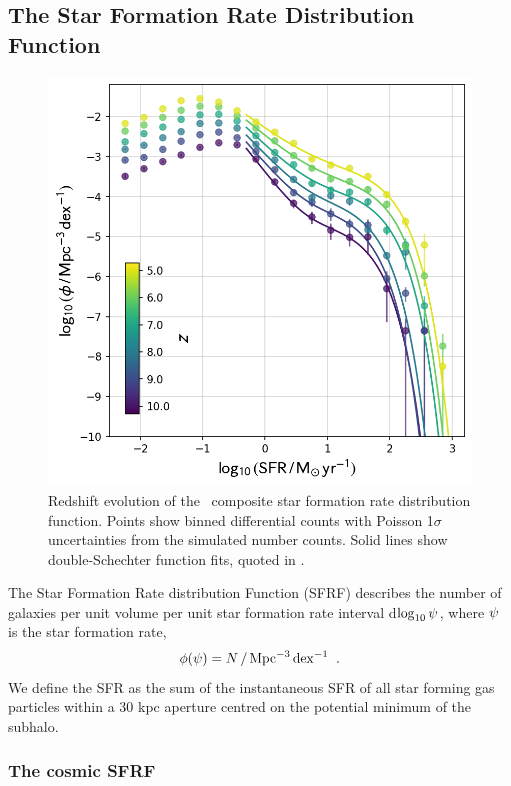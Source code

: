 \subsection{The Star Formation Rate Distribution Function}
\label{sec:cos_sfrf}

\begin{figure}
	\includegraphics[width=\columnwidth]{images/sfrf_all.png}
    \caption{Redshift evolution of the \flares\ composite star formation rate distribution function.
		Points show binned differential counts with Poisson 1$\sigma$ uncertainties from the simulated number counts.
		Solid lines show double-Schechter function fits, quoted in .}
    \label{fig:sfrf_all}
\end{figure}

The Star Formation Rate distribution Function (SFRF) describes the number of galaxies per unit volume per unit star formation rate interval d$\log_{10}\psi$, where $\psi$ is the star formation rate,
\begin{align}
     \phi(\psi) = N \,/\, \mathrm{Mpc^{-3} \, dex^{-1}}\;\;.
\end{align}
We define the SFR as the sum of the instantaneous SFR of all star forming gas particles within a 30 kpc aperture centred on the potential minimum of the subhalo.

\subsubsection{The cosmic SFRF}
\label{sec:results:sfrf:cosmic}

